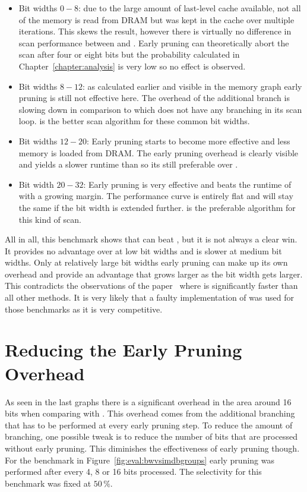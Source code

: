 \begin{itemize}
  \item Bit widths $0-8$: due to the large amount of last-level cache
  available, not all of the memory is read from DRAM but was kept in the cache
  over multiple iterations. This skews the result, however there is virtually
  no difference in scan performance between \simdscan{} and \bwv{}. Early
  pruning can theoretically abort the scan after four or eight bits but the
  probability calculated in Chapter~\ref{chapter:analysis} is very low so no
  effect is observed.
  \item Bit widths $8-12$: as calculated earlier and visible in the memory
  graph early pruning is still not effective here. The overhead of the additional
  branch is slowing down \bwv{} in comparison to \simdscan{} which does not have
  any branching in its scan loop. \simdscan{} is the better scan algorithm for
  these common bit widths.
  \item Bit widths $12-20$: Early pruning starts to become more effective and
  less memory is loaded from DRAM. The early pruning overhead is clearly
  visible and yields a slower runtime than \simdscan{} so its still preferable
  over \bwv{}.
  \item Bit width $20-32$: Early pruning is very effective and beats the
  runtime of \simdscan{} with a growing margin. The performance curve is
  entirely flat and will stay the same if the bit width is extended further.
  \bwv{} is the preferable algorithm for this kind of scan.
\end{itemize}

All in all, this benchmark shows that \bwv{} can beat \simdscan{}, but it is not
always a clear win. It provides no advantage over \simdscan{} at low bit widths
and is slower at medium bit widths. Only at relatively large bit widths early
pruning can make up its own overhead and provide an advantage that grows larger
as the bit width gets larger. This contradicts the observations of the
\bwv{} paper~\cite{BitWeaving} where \bwv{} is significantly faster than all
other methods. It is very likely that a faulty implementation of \simdscan{} was
used for those benchmarks as it is very competitive.

\section{Reducing the Early Pruning Overhead}

As seen in the last graphs there is a significant overhead in the area around
16 bits when comparing \bwv{} with \simdscan{}. This overhead comes from the
additional branching that has to be performed at every early pruning step. To
reduce the amount of branching, one possible tweak is to reduce the number of
bits that are processed without early pruning. This diminishes the
effectiveness of early pruning though. For the benchmark in
Figure~\ref{fig:eval:bwvsimdbgroups} early pruning was performed after every 4,
8 or 16 bits processed. The selectivity for this benchmark was fixed at $50\,\%$.

